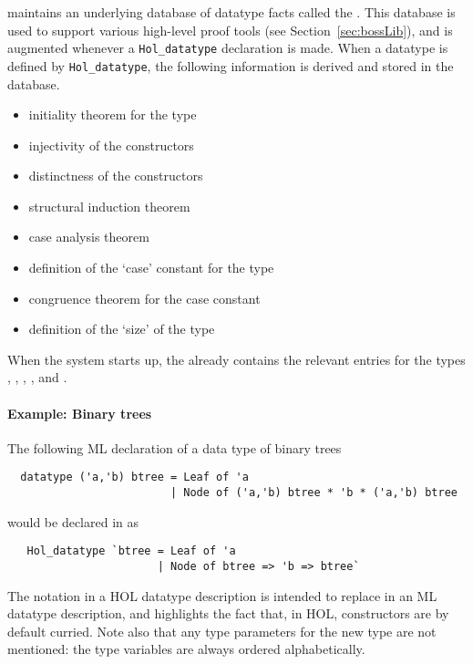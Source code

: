 %
\HOL{} maintains an underlying database of datatype facts called the
.  This database is used to support various high-level
proof tools (see Section~\ref{sec:bossLib}), and is augmented whenever
a \verb+Hol_datatype+ declaration is made.  When a datatype is
defined by \verb+Hol_datatype+, the following information is derived
and stored in the database.

\begin{itemize}
\item initiality theorem for the type
\item injectivity of the constructors
\item distinctness of the constructors
\item structural induction theorem
\item case analysis theorem
\item definition of the `case' constant for the type
\item congruence theorem for the case constant
\item definition of the `size' of the type
\end{itemize}

When the \HOL{} system
starts up, the  already contains the relevant entries for
the types , , , ,
and .

\paragraph{Example: Binary trees}
The following ML declaration of a data type of binary trees
\begin{hol}
\begin{verbatim}
  datatype ('a,'b) btree = Leaf of 'a
                         | Node of ('a,'b) btree * 'b * ('a,'b) btree
\end{verbatim}
\end{hol}
\noindent would be declared in \HOL{} as
\begin{hol}
\begin{verbatim}
   Hol_datatype `btree = Leaf of 'a
                       | Node of btree => 'b => btree`
\end{verbatim}
\end{hol}
\noindent The \holtxt{=>} notation in a HOL datatype description
is intended to replace \holtxt{*} in an ML datatype description,
and highlights the fact that, in HOL, constructors are by default
curried.  Note also that any type parameters for the new type are not
mentioned: the type variables are always ordered alphabetically.

